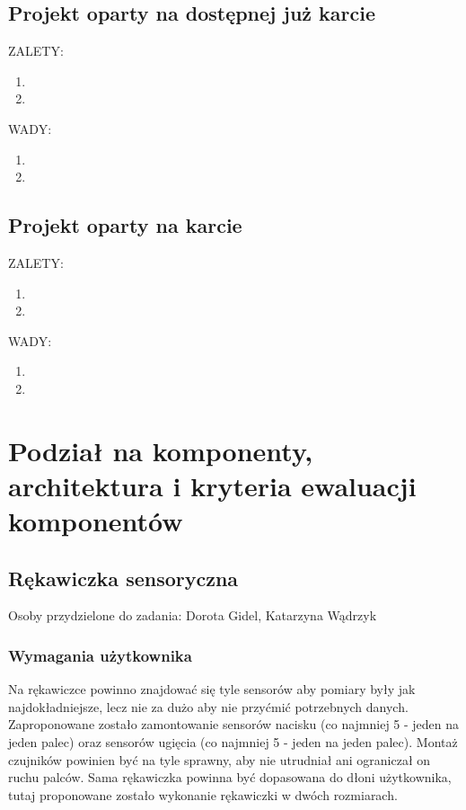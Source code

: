 \documentclass{article}
\begin{document}
\subsection{Projekt oparty na dostępnej już karcie }
ZALETY:\\
\begin{enumerate}
    \item
    \item
\end{enumerate}
WADY:\\
\begin{enumerate}
    \item
    \item
\end{enumerate}
\subsection{Projekt oparty na karcie }
ZALETY:\\
\begin{enumerate}
    \item
    \item
\end{enumerate}
WADY:\\
\begin{enumerate}
    \item
    \item
\end{enumerate}
\section{Podział na komponenty, architektura i kryteria ewaluacji komponentów}
\subsection{Rękawiczka sensoryczna}
Osoby przydzielone do zadania: Dorota Gidel, Katarzyna Wądrzyk
\subsubsection{Wymagania użytkownika}
Na rękawiczce powinno znajdować się tyle sensorów aby pomiary były jak najdokładniejsze, lecz nie za dużo aby nie przyćmić potrzebnych danych. Zaproponowane zostało zamontowanie sensorów nacisku (co najmniej 5 - jeden na jeden palec) oraz sensorów ugięcia (co najmniej 5 - jeden na jeden palec). Montaż czujników powinien być na tyle sprawny, aby nie utrudniał ani ograniczał on ruchu palców. Sama rękawiczka powinna być dopasowana do dłoni użytkownika, tutaj proponowane zostało wykonanie rękawiczki w dwóch rozmiarach.
\end{document}
